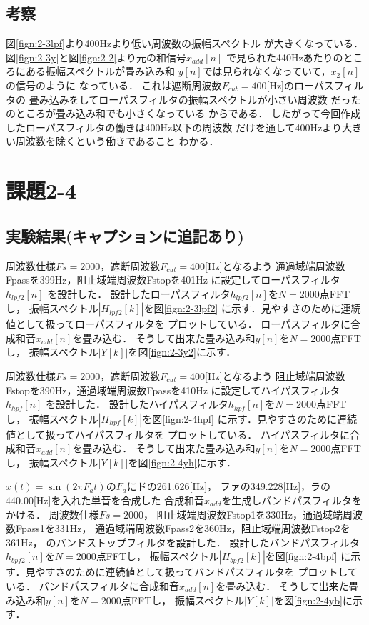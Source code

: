 \documentclass[11pt, a4paper, titlepage]{ltjsarticle}
\begin{document}
\subsection*{考察}
図\ref*{fign:2-3lpf}より400Hzより低い周波数の振幅スペクトル
が大きくなっている．
図\ref*{fign:2-3y}と図\ref*{fign:2-2}より元の和信号$x_{add}[n]$
で見られた440Hzあたりのところにある振幅スペクトルが畳み込み和
$y[n]$では見られなくなっていて，$x_{2}[n]$の信号のように
なっている．
これは遮断周波数$F_{cut}=400$[Hz]のローパスフィルタの
畳み込みをしてローパスフィルタの振幅スペクトルが小さい周波数
だったのところが畳み込み和でも小さくなっている
からである．
したがって今回作成したローパスフィルタの働きは400Hz以下の周波数
だけを通して400Hzより大きい周波数を除くという働きであること
わかる．

\newpage
\section*{課題2-4}
\subsection*{実験結果(キャプションに追記あり)}
周波数仕様$Fs=2000$，遮断周波数$F_{cut}=400$[Hz]となるよう
通過域端周波数Fpassを399Hz，阻止域端周波数Fstopを401Hz
に設定してローパスフィルタ$h_{lpf2}[n]$ を設計した．
設計したローパスフィルタ$h_{lpf2}[n]$を$N=2000$点FFTし，
振幅スペクトル$|H_{lpf2}[k]|$を図\ref*{fign:2-3lpf2}
に示す．見やすさのために連続値として扱ってローパスフィルタを
プロットしている．
ローパスフィルタに合成和音$x_{add}[n]$を畳み込む．
そうして出来た畳み込み和$y[n]$を$N=2000$点FFTし，
振幅スペクトル$|Y[k]|$を図\ref*{fign:2-3y2}に示す．

周波数仕様$Fs=2000$，遮断周波数$F_{cut}=400$[Hz]となるよう
阻止域端周波数Fstopを390Hz，通過域端周波数Fpassを410Hz
に設定してハイパスフィルタ$h_{hpf}[n]$ を設計した．
設計したハイパスフィルタ$h_{hpf}[n]$を$N=2000$点FFTし，
振幅スペクトル$|H_{hpf}[k]|$を図\ref*{fign:2-4hpf}
に示す．見やすさのために連続値として扱ってハイパスフィルタを
プロットしている．
ハイパスフィルタに合成和音$x_{add}[n]$を畳み込む．
そうして出来た畳み込み和$y[n]$を$N=2000$点FFTし，
振幅スペクトル$|Y[k]|$を図\ref*{fign:2-4yh}に示す．

$x(t)=\sin(2\pi F_{a}t)$の$F_{a}$にドの261.626[Hz]，
ファの349.228[Hz]，ラの440.00[Hz]を入れた単音を合成した
合成和音$x_{add}$を生成しバンドパスフィルタをかける．
周波数仕様$Fs=2000$，
阻止域端周波数Fstop1を330Hz，通過域端周波数Fpass1を331Hz，
通過域端周波数Fpass2を360Hz，阻止域端周波数Fstop2を361Hz，
のバンドストップフィルタを設計した．
設計したバンドパスフィルタ$h_{bpf2}[n]$を$N=2000$点FFTし，
振幅スペクトル$|H_{bpf2}[k]|$を図\ref*{fign:2-4bpf}
に示す．見やすさのために連続値として扱ってバンドパスフィルタを
プロットしている．
バンドパスフィルタに合成和音$x_{add}[n]$を畳み込む．
そうして出来た畳み込み和$y[n]$を$N=2000$点FFTし，
振幅スペクトル$|Y[k]|$を図\ref*{fign:2-4yb}に示す．
\end{document}
